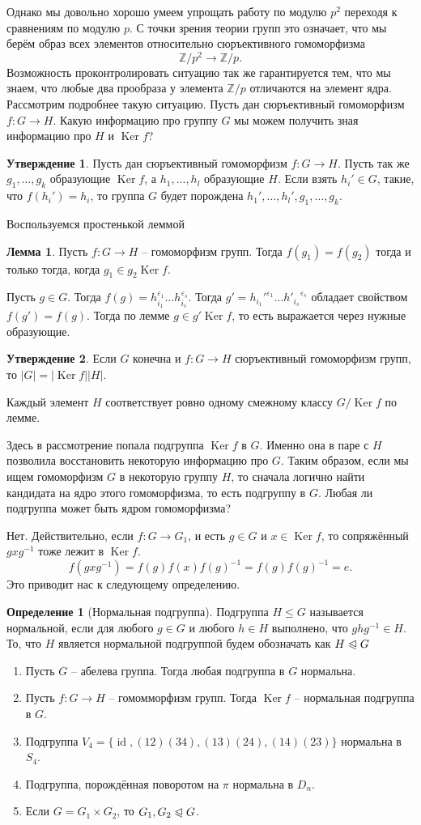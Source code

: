 \documentclass[10pt,a4paper,oneside]{book}
\theoremstyle{definition}
\newtheorem*{defn}{\color{yellow!30!red} Определение}
\newtheorem{lem}{\color{green!50!black}Лемма}
\newtheorem{utvr}{\color{blue!50!black}Утверждение}
\renewcommand{\leq}{\leqslant}
\newcommand{\mb}[1]{\mathbb{#1}}
\newcommand{\id}{\operatorname{id}}
\DeclareMathOperator{\Ker}{Ker}
\def\exm{\noindent {\bf Примеры:}}
\def\eps{\varepsilon}
\def\dfn{\begin{defn}}
\def\edfn{\end{defn}}
\def\lm{\begin{lem}}
\def\elm{\end{lem}}
\def\enm{\begin{enumerate}}
\def\eenm{\end{enumerate}}
\def\utv{\begin{utvr}}
\def\eutv{\end{utvr}}
\def\nrml{\trianglelefteqslant}
\begin{document}
Однако мы довольно хорошо умеем упрощать работу по модулю $p^2$ переходя к сравнениям по модулю $p$. С точки зрения теории групп это означает, что мы берём образ всех элементов относительно сюръективного гомоморфизма 
$$\mb Z/p^2 \to \mb Z/p.$$
Возможность проконтролировать ситуацию так же гарантируется тем, что мы знаем, что любые два прообраза у элемента $\mb Z/p$ отличаются на элемент ядра.
Рассмотрим подробнее такую ситуацию. Пусть дан сюръективный гомоморфизм $f \colon G \to H$. Какую информацию про группу $G$ мы можем получить зная информацию про $H$ и $\Ker f$?

\utv Пусть дан сюръективный гомоморфизм $f \colon G \to H$. Пусть так же $g_1,\dots,g_k$ образующие $\Ker f$, а $h_1,\dots, h_l$ образующие $H$. Если взять $h_i'\in G$, такие, что $f(h_i')=h_i$, то группа $G$ будет порождена $h_1',\dots,h_l', g_1,\dots,g_k$.
\eutv
\proof  Воспользуемся простенькой леммой
\lm Пусть $f\colon G \to H$ -- гомоморфизм групп. Тогда $f(g_1)=f(g_2)$ тогда и только тогда, когда $g_1\in g_2 \Ker f$.
\elm
Пусть $g\in G$. Тогда $f(g)=h_{i_1}^{\eps_1}\dots h_{i_s}^{\eps_s}$. Тогда $g'={h_{i_1}'}^{\eps_1}\dots {h'_{i_s}}^{\eps_s}$ обладает свойством $f(g')=f(g)$. Тогда по лемме $g\in g'\Ker f$, то есть выражается через нужные образующие.
\endproof

\utv  Если $G$ конечна  и  $f\colon G \to H$ сюръективный гомоморфизм групп, то $|G|=|\Ker f| |H|$.
\eutv
\proof Каждый элемент $H$ соответствует ровно одному смежному классу $G/\Ker f$ по лемме.
\endproof

Здесь в рассмотрение попала подгруппа $\Ker f$ в $G$. Именно она в паре с $H$ позволила восстановить некоторую информацию про $G$. Таким образом, если мы ищем гомоморфизм $G$ в некоторую группу $H$, то сначала логично найти кандидата на ядро этого гомоморфизма, то есть подгруппу в $G$. Любая ли подгруппа может быть ядром гомоморфизма? 

Нет. Действительно, если $f \colon G \to G_1$, и есть $g \in G$ и $x\in \Ker f$, то  сопряжённый $gxg^{-1}$ тоже лежит в $\Ker f$. 
$$f(gxg^{-1})=f(g)f(x)f(g)^{-1}=f(g)f(g)^{-1}=e.$$
Это приводит нас к следующему определению.

\dfn[Нормальная подгруппа] Подгруппа $H\leq G$ называется нормальной, если для любого $g\in G$ и любого $h \in H$ выполнено, что $ghg^{-1}\in H$. То, что $H$ является нормальной подгруппой будем обозначать как $H \nrml G$
\edfn

\exm \enm
\item Пусть $G$ -- абелева группа. Тогда любая подгруппа в $G$ нормальна.
\item Пусть $f\colon G \to H$ -- гомомморфизм групп. Тогда $\Ker f$ -- нормальная подгруппа в $G$.
\item Подгруппа $V_4=\{\id, (12)(34), (13)(24), (14)(23)\}$ нормальна в $S_4$.
\item Подгруппа, порождённая поворотом на $\pi$ нормальна в $D_n$.
\item Если $G=G_1\times G_2$, то $G_1,G_2\nrml G$.
\eenm
\end{document}
